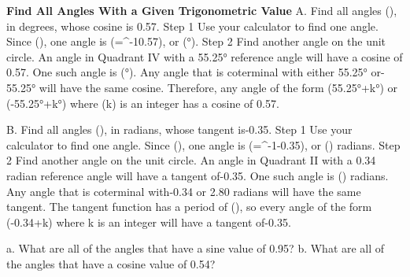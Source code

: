 \documentclass{article}
\newenvironment{example}[1]{}{}         %
\newenvironment{tryit}[1]{}{}           %
\newcommand{\answer}[1]{}               %
\newcommand{\placeholder}[2]{}          %
\newcommand{\te}[1]{}                   %
\begin{document}
\begin{example}{3}
\textbf{Find All Angles With a Given Trigonometric Value}
A. Find all angles (\theta), in degrees, whose cosine is 0.57.
Step 1 Use your calculator to find one angle. Since (\cos{}), one angle is (\theta=\cos^{-1}0.57), or (\theta{}°).
Step 2 Find another angle on the unit circle. An angle in Quadrant IV with a 55.25° reference angle will have a cosine of 0.57. One such angle is (\theta{}°).
Any angle that is coterminal with either 55.25° or-55.25° will have the same cosine. Therefore, any angle of the form (55.25°+k°) or (-55.25°+k°) where (k) is an integer has a cosine of 0.57.
\placeholder{diagram}{Blackunitcircle witharrowedx,yaxes,O,squaregrid1/4,xlabels-1,-0.5,ylabels-1,-0.5,0.5,1;windowx-1.5..1.75,y-1.25..1.25. Two blackrays toquadrantsIandIV throughred(0.57,0.82)andblue(0.57,-0.82),verticalredandbluelegs toxaxis,red55°arc. Callout: Two points on the unit circle have an x-coordinate of 0.57.}
\te{COMMON ERROR When using technology to solve trigonometric functions, make sure you have the correct system of angle measure selected.}
\answer{A. (55.25°+k\cdot360°) or (-55.25°+k\cdot360°), where k is an integer.}
B. Find all angles (\theta), in radians, whose tangent is-0.35.
Step 1 Use your calculator to find one angle. Since (\tan{}), one angle is (\theta=\tan^{-1}-0.35), or (\theta{}) radians.
Step 2 Find another angle on the unit circle. An angle in Quadrant II with a 0.34 radian reference angle will have a tangent of-0.35. One such angle is (\theta{}) radians.
Any angle that is coterminal with-0.34 or 2.80 radians will have the same tangent. The tangent function has a period of (\pi), so every angle of the form (-0.34+k\pi) where k is an integer will have a tangent of-0.35.
\placeholder{diagram}{Blackunitcircle witharrowedx,yaxes,labels+-1bothaxes,grid1/4;windowx-1.5..1.5,y-1.25..1.25. Redray fromorigin throughquadrantIV at-0.34radians,blueoppositeray toquadrantII,botharrowed. Redclockwisearcfrompositivexaxis labeled-0.34,andredreferencearc atnegativexaxis.}
\te{STUDY TIP When asked to solve an equation involving an inverse trig function, use the domain and range of the function. When asked about all possible angles, provide a complete list, such as (55.25°+(360°)k) or (-55.25°+(360°)k).}
\answer{B. (-0.34+k\pi), where k is an integer.}
\end{example}
\begin{tryit}{3}
a. What are all of the angles that have a sine value of 0.95?
b. What are all of the angles that have a cosine value of 0.54?
\answer{a. (71.8°+(360°)k), (108.2°+(360°)k), where k is an integer. b. (57.3°+(360°)k), (-57.3°+(360°)k), where k is an integer.}
\end{tryit}
\end{document}
